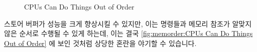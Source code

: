 \begin{figure}[tb]
\centering
{}
\caption{CPUs Can Do Things Out of Order}
\end{figure}

스토어 버퍼가 성능을 크게 향상시킬 수 있지만, 이는 명령들과 메모리 참조가
알맞지 않은 순서로 수행될 수 있게 하는데, 이는 결국
\cref{fig:memorder:CPUs Can Do Things Out of Order} 에 보인 것처럼 상당한
혼란을 야기할 수 있습니다.


